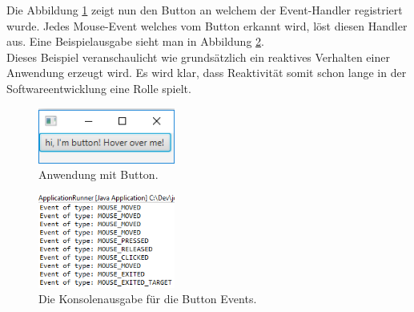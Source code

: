 
Die Abbildung \ref{pic:buttonapp} zeigt nun den Button an welchem der Event-Handler registriert wurde. Jedes Mouse-Event welches vom Button erkannt wird, löst diesen Handler aus. Eine Beispielausgabe sieht man in Abbildung \ref{pic:consoleoutput}. \\ Dieses Beispiel veranschaulicht wie grundsätzlich ein reaktives Verhalten einer Anwendung erzeugt wird. Es wird klar, dass Reaktivität somit schon lange in der Softwareentwicklung eine Rolle spielt.
\begin{figure}
	\centering
	\includegraphics[width=0.4\textwidth]{Abb/buttonapp.PNG}
	\caption{Anwendung mit Button.}
	\label{pic:buttonapp}
\end{figure}
\begin{figure}
	\centering
	\includegraphics[width=0.4\textwidth]{Abb/consoleoutput.PNG}
	\caption{Die Konsolenausgabe für die Button Events.}
	\label{pic:consoleoutput}
\end{figure}
